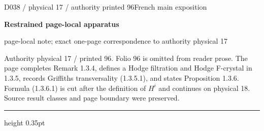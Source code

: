 \documentclass[9pt]{article}
\newcommand{\CanonText}[1]{\par{\fontsize{8.0}{9.35}\selectfont\RaggedRight #1\par}\vspace{2.2pt}}
\newcommand{\LayerTitle}{Restrained page-local apparatus}
\begin{document}
\noindent\begin{minipage}[t][\dimexpr\textheight-5pt\relax][t]{\textwidth}
{\sffamily\fontsize{7.3}{8.2}\selectfont\color{Quiet} D038 / physical 17 / authority printed 96\hfill French main exposition}
\par{}\vspace{4.5pt}
{\sffamily\fontsize{10.4}{11.6}\selectfont\bfseries\color{Accent} \LayerTitle}
\par{\sffamily\fontsize{6.7}{7.7}\selectfont\color{Quiet} page-local note; exact one-page correspondence to authority physical 17}
\vspace{5pt}
\CanonText{Authority physical 17 / printed 96. Folio 96 is omitted from reader prose. The page completes Remark 1.3.4, defines a Hodge filtration and Hodge F-crystal in 1.3.5, records Griffiths transversality (1.3.5.1), and states Proposition 1.3.6. Formula (1.3.6.1) is cut after the definition of \(H^{i}\) and continues on physical 18. Source result classes and page boundary were preserved.}
\vfill
{\color{Accent}\hrule height 0.35pt}\vspace{3pt}
\end{minipage}
\newpage
\end{document}
